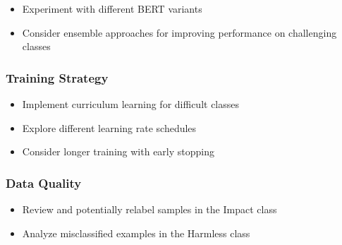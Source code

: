             \begin{itemize}
                \item Experiment with different BERT variants
                \item Consider ensemble approaches for improving performance on challenging classes
            \end{itemize}

        \subsubsection{Training Strategy}
        
            \begin{itemize}
                \item Implement curriculum learning for difficult classes
                \item Explore different learning rate schedules
                \item Consider longer training with early stopping
            \end{itemize}

        \subsubsection{Data Quality}
        
            \begin{itemize}
                \item Review and potentially relabel samples in the Impact class
                \item Analyze misclassified examples in the Harmless class
            \end{itemize}
    